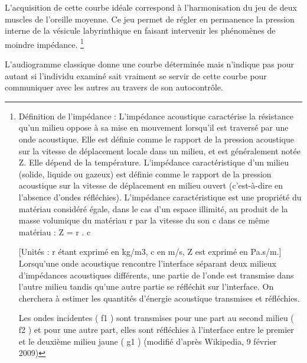 L'acquisition de cette courbe idéale correspond à l\textquoteright harmonisation
du jeu de deux muscles de l\textquoteright oreille moyenne. Ce jeu
permet de régler en permanence la pression interne de la vésicule
labyrinthique en faisant intervenir les phénomènes de moindre impédance.
\footnote{Définition de l\textquoteright impédance : L'impédance acoustique
caractérise la résistance qu'un milieu oppose à sa mise en mouvement
lorsqu'il est traversé par une onde acoustique. Elle est définie comme
le rapport de la pression acoustique sur la vitesse de déplacement
locale dans un milieu, et est généralement notée Z. Elle dépend de
la température. L'impédance caractéristique d'un milieu (solide, liquide
ou gazeux) est définie comme le rapport de la pression acoustique
sur la vitesse de déplacement en milieu ouvert (c\textquoteright est-à-dire
en l'absence d'ondes réfléchies). L'impédance caractéristique est
une propriété du matériau considéré égale, dans le cas d'un espace
illimité, au produit de la masse volumique du matériau \textgreek{r}
par la vitesse du son c dans ce même matériau : Z = \textgreek{r}
. c

{[}Unités : \textgreek{r} étant exprimé en kg/m3, c en m/s, Z est
exprimé en Pa.s/m.{]} Lorsqu'une onde acoustique rencontre l'interface
séparant deux milieux d'impédances acoustiques différents, une partie
de l'onde est transmise dans l'autre milieu tandis qu'une autre partie
se réfléchit sur l'interface. On cherchera à estimer les quantités
d'énergie acoustique transmises et réfléchies.

Les ondes incidentes ( f1 ) sont transmises pour une part au second
milieu ( f2 ) et pour une autre part, elles sont réfléchies à l\textquoteright interface
entre le premier et le deuxième milieu jaune ( g1 ) (modifié d\textquoteright après
Wikipedia, 9 février 2009) }

L\textquoteright audiogramme classique donne une courbe déterminée
mais n\textquoteright indique pas pour autant si l'individu examiné
sait vraiment se servir de cette courbe pour communiquer avec les
autres au travers de son autocontrôle.

